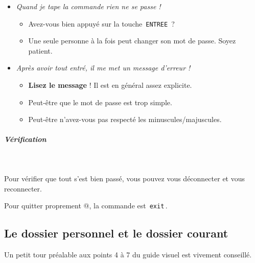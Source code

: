 \documentclass[11pt,a4paper]{article}
\begin{document}
					\begin{itemize}
				
			\item \textit{Quand je tape la commande rien ne se passe !}
					\begin{itemize}
				
			\item Avez-vous bien appuy\'e sur la touche \,\verb|ENTREE|\, ?
			\item Une seule personne \`a la fois peut changer son mot de passe. Soyez patient.
					\end{itemize}
				
			\item \textit{Apr\`es avoir tout entr\'e, il me met un message d'erreur !}
					\begin{itemize}
				
			\item \textbf{Lisez le message} ! Il est en g\'en\'eral assez explicite.
			\item Peut-\^etre que le mot de passe est trop simple.
			\item Peut-\^etre n'avez-vous pas respect\'e les minuscules/majuscules.
					\end{itemize}
				
					\end{itemize}
				
			
		\subparagraph{V\'erification} 
		
					\textcolor{white}{.} \par
				
            \par
        
					Pour v\'erifier que tout s'est bien pass\'e, vous pouvez vous d\'econnecter et vous reconnecter.
        
            \par
        
					Pour quitter proprement @, 
					la commande est \,\verb|exit|\,.
				
            \par
        \subsection{Le dossier personnel et le dossier courant}
					Un petit tour pr\'ealable aux points 4 \`a 7 du guide visuel est vivement conseill\'e.
				
            \par
        
\end{document}
